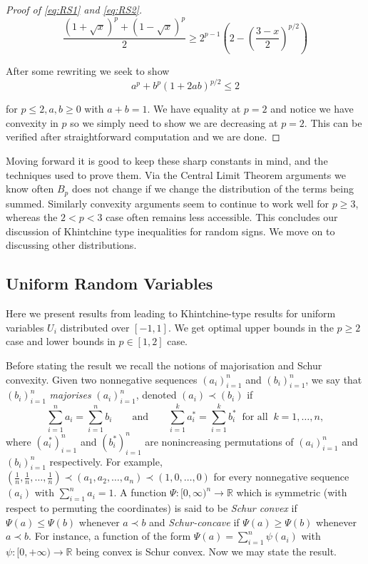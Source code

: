\documentclass[10pt]{article}
\newcommand{\1}{\textbf{1}}
\newcommand{\R}{\mathbb{R}}
\theoremstyle{remark}
\theoremstyle{definition}
\begin{document}
\begin{proof}[Proof of \ref{eq:RS1} and \ref{eq:RS2}]
	\begin{equation*}
		\frac{(1+\sqrt{x})^p + (1-\sqrt{x})^p}{2} \geq 2^{p-1}(2-(\frac{3-x}{2})^{p/2})
	\end{equation*}

	After some rewriting we seek to show
	\begin{equation*}
		a^p + b^p (1+2ab)^{p/2} \leq 2
	\end{equation*}

	for $p \leq 2, a,b \geq 0$ with $a+b = 1$. We have equality at $p=2$ and notice we have convexity in $p$ so we simply need to show  we are decreasing at $p=2$. This can be verified after straightforward computation and we are done.
\end{proof}

Moving forward it is good to keep these sharp constants in mind, and the techniques used to prove them. Via the Central Limit Theorem arguments we know often $B_p$ does not change if we change the distribution of the terms being summed. Similarly convexity arguments seem to continue to work well for $p \geq 3$, whereas the $2 < p < 3$ case often remains less accessible. This concludes our discussion of Khintchine type inequalities for random signs. We move on to discussing other distributions.

\subsection{Uniform Random Variables}

Here we present results from \cite{LO} leading to Khintchine-type results for uniform variables $U_i$ distributed over $[-1,1]$. We get optimal upper bounds in the $p \geq 2$ case and lower bounds in $p \in [1,2]$ case. 

Before stating the result we recall the notions of majorisation and Schur convexity. Given two nonnegative sequences $(a_i)_{i=1}^n$ and $(b_i)_{i=1}^n$, we say that $(b_i)_{i=1}^n$ \emph{majorises} $(a_i)_{i=1}^n$, denoted $(a_i) \prec (b_i)$ if
\[
\sum_{i=1}^n a_i = \sum_{i=1}^n b_i \qquad \text{and} \qquad \sum_{i=1}^k a_i^* = \sum_{i=1}^k b_i^* \ \text{ for all } \ k = 1,\ldots,n,
\]
where $(a_i^*)_{i=1}^n$ and $(b_i^*)_{i=1}^n$ are nonincreasing permutations of $(a_i)_{i=1}^n$ and $(b_i)_{i=1}^n$ respectively. For example, $(\frac{1}{n},\frac{1}{n},\dots,\frac{1}{n}) \prec (a_1,a_2,\dots,a_n) \prec (1,0,\dots,0)$ for every nonnegative sequence $(a_i)$ with $\sum_{i=1}^n a_i = 1$. A function $\Psi\colon [0,\infty)^n \to \R$ which is symmetric (with respect to permuting the coordinates) is said to be \emph{Schur convex} if $\Psi(a) \leq \Psi(b)$ whenever $a \prec b$ and \emph{Schur-concave} if $\Psi(a) \geq \Psi(b)$ whenever $a \prec b$. For instance, a function of the form $\Psi(a) = \sum_{i=1}^n \psi(a_i)$ with $\psi\colon [0,+\infty) \to \R$ being convex is Schur convex. Now we may state the result.
\end{document}

